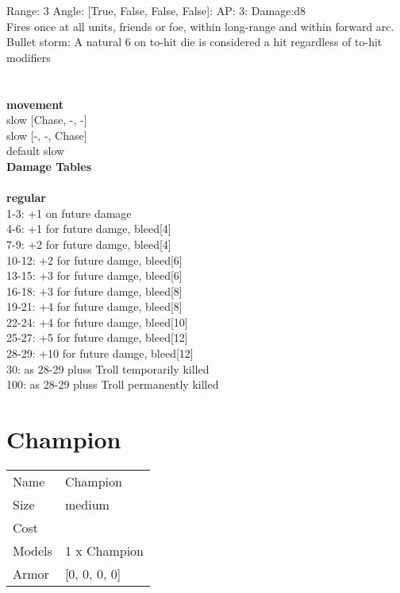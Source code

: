 Range: 3  Angle: [True, False, False, False]: AP: 3: Damage:d8 \\
Fires once at all units, friends or foe, within long-range and within forward arc.\\ 
Bullet storm: A natural 6 on to-hit die is considered a hit regardless of to-hit modifiers\\ 




 
\ \\




\ \\ {\bf movement } \\
slow [Chase, -, -] \\
slow [-, -, Chase] \\
default slow \\


{\bf Damage Tables} \\
\ \\ {\bf regular } \\
1-3: +1 on future damage \\
4-6: +1 for future damge, bleed[4] \\
7-9: +2 for future damge, bleed[4] \\
10-12: +2 for future damge, bleed[6] \\
13-15: +3 for future damge, bleed[6] \\
16-18: +3 for future damge, bleed[8] \\
19-21: +4 for future damge, bleed[8] \\
22-24: +4 for future damge, bleed[10] \\
25-27: +5 for future damge, bleed[12] \\
28-29: +10 for future damge, bleed[12] \\
30: as 28-29 pluss Troll temporarily killed \\
100: as 28-29 pluss Troll permanently killed \\










\pagebreak\pagebreak

\section{ Champion }

\begin{tabular}{ll}
  Name & Champion \\
  Size & medium\\
  Cost & \\
  Models & 1 x Champion\\
  Armor & [0, 0, 0, 0]\\
\end{tabular}


